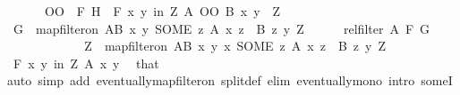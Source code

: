 \begin{isabellebody}
\ \ \ \ {\isacharparenleft}{\kern0pt}\ {\isachardoublequoteopen}{\isacharparenleft}{\kern0pt}{\isacharunderscore}{\kern0pt}\ OO\ {\isacharunderscore}{\kern0pt}{\isacharparenright}{\kern0pt}\ {\isacharquery}{\kern0pt}F\ {\isacharquery}{\kern0pt}H{\isachardoublequoteclose}{\isacharparenright}{\kern0pt}\ \ {\isachardoublequoteopen}{\isasymforall}\isactrlsub F\ {\isacharparenleft}{\kern0pt}x{\isacharcomma}{\kern0pt}\ y{\isacharparenright}{\kern0pt}\ in\ Z{\isachardot}{\kern0pt}\ {\isacharparenleft}{\kern0pt}A\ OO\ B{\isacharparenright}{\kern0pt}\ x\ y{\isachardoublequoteclose}\ \ Z\isanewline
\ \ \isamarkupfalse%
\isanewline
\ \ \ \ \isamarkupfalse%
\ {\isacharquery}{\kern0pt}G\ {\isacharequal}{\kern0pt}\ {\isachardoublequoteopen}map{\isacharunderscore}{\kern0pt}filter{\isacharunderscore}{\kern0pt}on\ {\isacharquery}{\kern0pt}AB\ {\isacharparenleft}{\kern0pt}{\isasymlambda}{\isacharparenleft}{\kern0pt}x{\isacharcomma}{\kern0pt}\ y{\isacharparenright}{\kern0pt}{\isachardot}{\kern0pt}\ SOME\ z{\isachardot}{\kern0pt}\ A\ x\ z\ {\isasymand}\ B\ z\ y{\isacharparenright}{\kern0pt}\ Z{\isachardoublequoteclose}\isanewline
\ \ \ \ \isamarkupfalse%
\ {\isachardoublequoteopen}rel{\isacharunderscore}{\kern0pt}filter\ A\ {\isacharquery}{\kern0pt}F\ {\isacharquery}{\kern0pt}G{\isachardoublequoteclose}\isanewline
\ \ \ \ \isamarkupfalse%
\isanewline
\ \ \ \ \ \ \isamarkupfalse%
\ {\isacharquery}{\kern0pt}Z\ {\isacharequal}{\kern0pt}\ {\isachardoublequoteopen}map{\isacharunderscore}{\kern0pt}filter{\isacharunderscore}{\kern0pt}on\ {\isacharquery}{\kern0pt}AB\ {\isacharparenleft}{\kern0pt}{\isasymlambda}{\isacharparenleft}{\kern0pt}x{\isacharcomma}{\kern0pt}\ y{\isacharparenright}{\kern0pt}{\isachardot}{\kern0pt}\ {\isacharparenleft}{\kern0pt}x{\isacharcomma}{\kern0pt}\ SOME\ z{\isachardot}{\kern0pt}\ A\ x\ z\ {\isasymand}\ B\ z\ y{\isacharparenright}{\kern0pt}{\isacharparenright}{\kern0pt}\ Z{\isachardoublequoteclose}\isanewline
\ \ \ \ \ \ \isamarkupfalse%
\ {\isachardoublequoteopen}{\isasymforall}\isactrlsub F\ {\isacharparenleft}{\kern0pt}x{\isacharcomma}{\kern0pt}\ y{\isacharparenright}{\kern0pt}\ in\ {\isacharquery}{\kern0pt}Z{\isachardot}{\kern0pt}\ A\ x\ y{\isachardoublequoteclose}\ \isamarkupfalse%
\ that\isanewline
\ \ \ \ \ \ \ \ \isamarkupfalse%
{\isacharparenleft}{\kern0pt}auto\ simp\ add{\isacharcolon}{\kern0pt}\ eventually{\isacharunderscore}{\kern0pt}map{\isacharunderscore}{\kern0pt}filter{\isacharunderscore}{\kern0pt}on\ split{\isacharunderscore}{\kern0pt}def\ elim{\isacharbang}{\kern0pt}{\isacharcolon}{\kern0pt}\ eventually{\isacharunderscore}{\kern0pt}mono\ intro{\isacharcolon}{\kern0pt}\ someI{}{\isacharparenright}{\kern0pt}\isanewline

\end{isabellebody}
